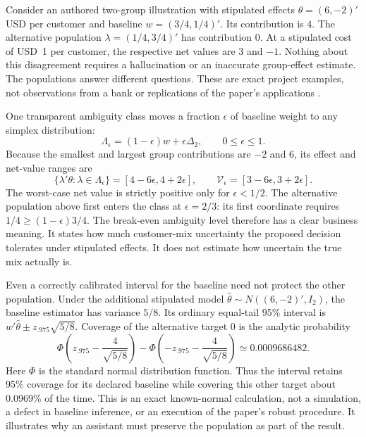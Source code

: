 Consider an authored two-group illustration with stipulated effects
$\theta=(6,-2)'$ USD per customer and baseline
$w=(3/4,1/4)'$. Its contribution is $4$. The alternative population
$\lambda=(1/4,3/4)'$ has contribution $0$. At a stipulated cost of USD~1 per
customer, the respective net values are $3$ and $-1$. Nothing about this
disagreement requires a hallucination or an inaccurate group-effect estimate.
The populations answer different questions. These are exact project examples,
not observations from a bank or replications of the paper's applications
\citep{exec22_weighted_reference}.

One transparent ambiguity class moves a fraction $\epsilon$ of baseline
weight to any simplex distribution:
\begin{equation}
 \Lambda_\epsilon=(1-\epsilon)w+\epsilon\Delta_2,
 \qquad 0\leq\epsilon\leq1.
 \label{exec22:targets-class}
\end{equation}
Because the smallest and largest group contributions are $-2$ and $6$, its
effect and net-value ranges are
\begin{equation}
 \{\lambda'\theta:\lambda\in\Lambda_\epsilon\}
   =[4-6\epsilon,4+2\epsilon],\qquad
 \mathcal V_\epsilon=[3-6\epsilon,3+2\epsilon].
 \label{exec22:targets-value}
\end{equation}
The worst-case net value is strictly positive only for $\epsilon<1/2$.
The alternative population above first enters the class at $\epsilon=2/3$:
its first coordinate requires
$1/4\geq(1-\epsilon)3/4$. The break-even ambiguity level therefore has a clear
business meaning. It states how much customer-mix uncertainty the proposed
decision tolerates under stipulated effects. It does not estimate how uncertain
the true mix actually is.

Even a correctly calibrated interval for the baseline need not protect the
other population. Under the additional stipulated model
$\widehat\theta\sim N((6,-2)',I_2)$, the baseline estimator has variance $5/8$.
Its ordinary equal-tail 95\% interval is
$w'\widehat\theta\pm z_{.975}\sqrt{5/8}$. Coverage of the alternative target
$0$ is the analytic probability
\begin{equation}
 \Phi\!\left(z_{.975}-\frac{4}{\sqrt{5/8}}\right)
 -\Phi\!\left(-z_{.975}-\frac{4}{\sqrt{5/8}}\right)
 \simeq0.0009686482.
 \label{exec22:targets-wrong}
\end{equation}
Here $\Phi$ is the standard normal distribution function. Thus the interval
retains 95\% coverage for its declared baseline while covering this other
target about 0.0969\% of the time. This is an exact known-normal calculation,
not a simulation, a defect in baseline inference, or an execution of the
paper's robust procedure. It illustrates why an assistant must preserve the
population as part of the result.

